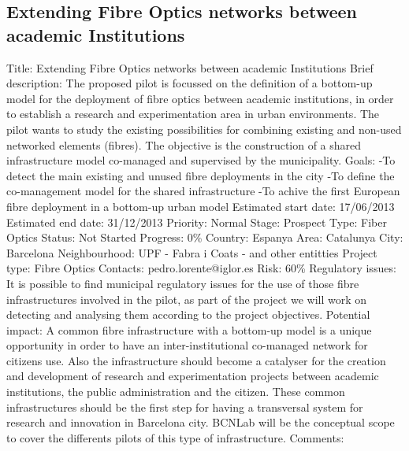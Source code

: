\documentclass[draftclsnofoot,12pt,journal,onecolumn]{IEEEtran}
\begin{document}
\subsection{Extending Fibre Optics networks between academic Institutions} 
Title: Extending Fibre Optics networks between academic Institutions 
Brief description: The proposed pilot is focussed on the definition of a 
bottom-up model for the deployment of fibre optics between academic 
institutions, in order to establish a research and experimentation area in 
urban environments. The pilot wants to study the existing possibilities for 
combining existing and non-used networked elements (fibres). The objective is 
the construction of a shared infrastructure model co-managed and supervised 
by the municipality. 
Goals: 
-To detect the main existing and unused fibre deployments in the city 
-To define the co-management model for the shared infrastructure 
-To achive the first European fibre deployment in a bottom-up urban model 
Estimated start date: 17/06/2013 
Estimated end date: 31/12/2013 
Priority: Normal 
Stage: Prospect 
Type: Fiber Optics 
Status: Not Started 
Progress: 0\% 
Country: Espanya 
Area: Catalunya 
City: Barcelona 
Neighbourhood: UPF - Fabra i Coats - and other entitties 
Project type: Fibre Optics 
Contacts: pedro.lorente@iglor.es
Risk: 60\% 
Regulatory issues: It is possible to find municipal regulatory issues for the 
use of those fibre infrastructures involved in the pilot, as part of the 
project we will work on detecting and analysing them according to the project 
objectives. 
Potential impact: A common fibre infrastructure with a bottom-up model is a 
unique opportunity in order to have an inter-institutional co-managed network 
for citizens use. Also the infrastructure should become a catalyser for the 
creation and development of research and experimentation projects between 
academic institutions, the public administration and the citizen. These 
common infrastructures should be the first step for having a transversal 
system for research and innovation in Barcelona city. BCNLab will be the 
conceptual scope to cover the differents pilots of this type of 
infrastructure. 
Comments: 
\end{document}
